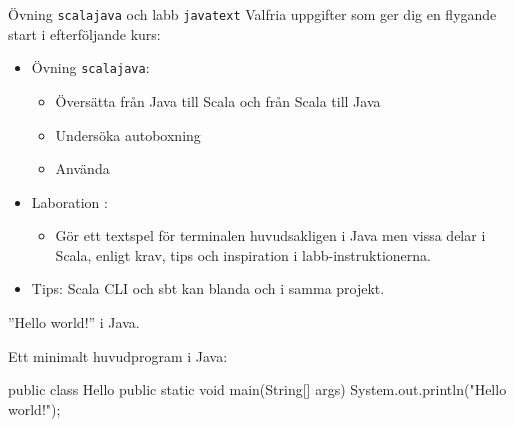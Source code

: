 



\begin{Slide}{Övning \texttt{scalajava} och labb \texttt{javatext}}\SlideFontSmall
Valfria uppgifter som ger dig en flygande start i efterföljande kurs:
\begin{itemize}
\item Övning \texttt{scalajava}:
\begin{itemize}\SlideFontTiny
\item Översätta från Java till Scala och från Scala till Java
\item Undersöka autoboxning 
\item Använda 
\end{itemize}
\item Laboration :
\begin{itemize}\SlideFontTiny
  \item Gör ett textspel för terminalen huvudsakligen i Java men vissa delar i Scala, enligt krav, tips och inspiration i labb-instruktionerna.

\end{itemize}
\item Tips: Scala CLI och sbt kan blanda  och  i samma projekt.
\end{itemize}
\end{Slide}


\begin{Slide}{''Hello world!'' i Java.}

\noindent Ett minimalt huvudprogram i Java:
\begin{Code}[language=Java]
public class Hello {
    public static void main(String[] args) {
        System.out.println("Hello world!");
    }
}
\end{Code}


\end{Slide}



